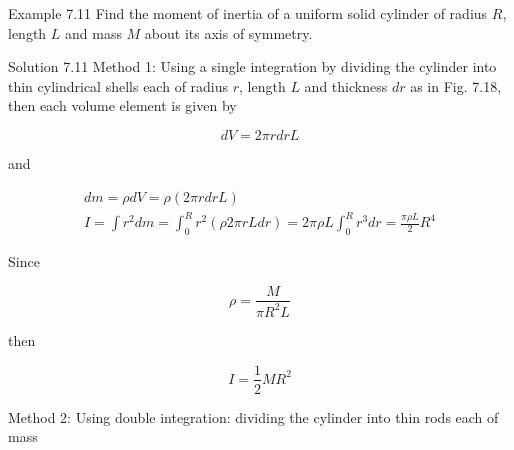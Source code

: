 \documentclass[10pt]{article}
\begin{document}
Example 7.11 Find the moment of inertia of a uniform solid cylinder of radius $R$, length $L$ and mass $M$ about its axis of symmetry.

Solution 7.11 Method 1: Using a single integration by dividing the cylinder into thin cylindrical shells each of radius $r$, length $L$ and thickness $d r$ as in Fig. 7.18, then each volume element is given by

$$
d V=2 \pi r d r L
$$

and

$$
\begin{gathered}
d m=\rho d V=\rho(2 \pi r d r L) \\
I=\int r^{2} d m=\int_{0}^{R} r^{2}(\rho 2 \pi r L d r)=2 \pi \rho L \int_{0}^{R} r^{3} d r=\frac{\pi \rho L}{2} R^{4}
\end{gathered}
$$

Since

$$
\rho=\frac{M}{\pi R^{2} L}
$$

then

$$
I=\frac{1}{2} M R^{2}
$$

Method 2: Using double integration: dividing the cylinder into thin rods each of mass
\end{document}
